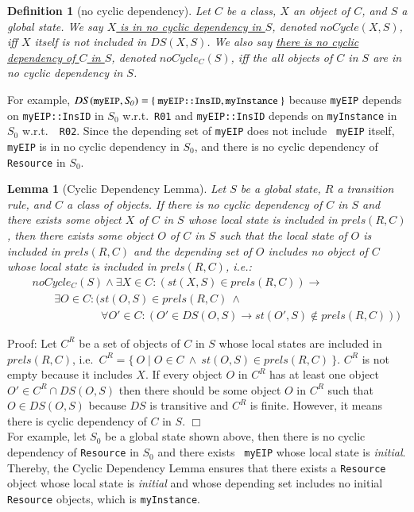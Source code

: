 \documentclass[12pt]{report}
\newtheorem{lemma}{Lemma}
\newtheorem{definition}{Definition}
\newcommand{\ra}{\rightarrow}
\newcommand{\mbstt}[1]{\mbox{\small{\tt {#1}}}}
\newcommand{\stt}[1]{{\small{\tt {#1}}}}
\newcommand{\ul}{\underline}
\begin{document}
\begin{definition}[no cyclic dependency]
Let $C$ be a class, $X$ an object of $C$, and $S$ a global
state. We say \ul{$X$ is in no cyclic dependency in $S$}, denoted
\ul{$noCycle(X,S)$}, iff $X$ itself is not included in $DS(X,S)$. We
also say \ul{there is no cyclic dependency of $C$ in $S$}, denoted
\ul{$noCycle_C(S)$}, iff the all objects of $C$ in $S$ are in no cyclic
dependency in $S$.
\end{definition}
For example, $DS(\mbstt{myEIP},\mathit{S_0}) =
\{~\mbstt{myEIP::InsID},\mbstt{myInstance}~\}$ because {\tt myEIP}
depends on \stt{myEIP::InsID} in $\mathit{S_0}$ w.r.t.\ {\tt R01} and
\stt{myEIP::InsID} depends on {\tt myInstance} in $\mathit{S_0}$ w.r.t.\ {\tt
  R02}. Since the depending set of {\tt myEIP} does not include {\tt
  myEIP} itself, {\tt myEIP} is in no cyclic dependency in $\mathit{S_0}$, and
there is no cyclic dependency of {\tt Resource} in $\mathit{S_0}$.
\begin{lemma}[Cyclic Dependency Lemma]
Let $S$ be a global state, $R$ a transition rule, and $C$ a
class of objects. If there is no cyclic dependency of $C$ in $S$
and there exists some object $X$ of $C$ in $S$ whose local state
is included in $prels(R,C)$, then there exists some object $O$ of $C$ in
$S$ such that the local state of $O$ is included in $prels(R,C)$ and the
depending set of $O$ includes no object of $C$ whose local
state is included in $prels(R,C)$, i.e.:
\begin{eqnarray*}
&&noCycle_C(S)\land\exists X\in C:(st(X,S)\in prels(R,C)) \ra\\
&&\:\:\:\:\:\:\:\:\:\exists O\in C:(st(O,S)\in prels(R,C)\ \land\\
&&\:\:\:\:\:\:\:\:\:\:\:\:\:\:\:\:\:\:\:\:\:\:\:\:\:\:\:\:
\forall O'\in C:(O'\in DS(O,S)\ra st(O',S)\not\in prels(R,C)))
\end{eqnarray*}
\end{lemma}
Proof: Let $C^R$ be a set of objects of $C$ in $S$ whose local states
are included in $prels(R,C)$, i.e.\ $C^R=\{~O\mid O\in C~\land~
st(O,S)\in prels(R,C)~\}$. $C^R$ is not empty because it includes $X$.
If every object $O$ in $C^R$ has at least one object $O' \in C^R\cap
DS(O,S)$ then there should be some object $O$ in $C^R$ such that $O
\in DS(O,S)$ because $DS$ is transitive and $C^R$ is finite. However,
it means there is cyclic dependency of $C$ in $S$. $\Box$\\

\noindent
For example, let $\mathit{S_0}$ be a global state shown above, then there is no
cyclic dependency of {\tt Resource} in $\mathit{S_0}$ and there exists {\tt
  myEIP} whose local state is {\it initial}. Thereby, the Cyclic
Dependency Lemma ensures that there exists a {\tt Resource} object
whose local state is {\it initial} and whose depending set includes no
initial {\tt Resource} objects, which is {\tt myInstance}.
\end{document}
